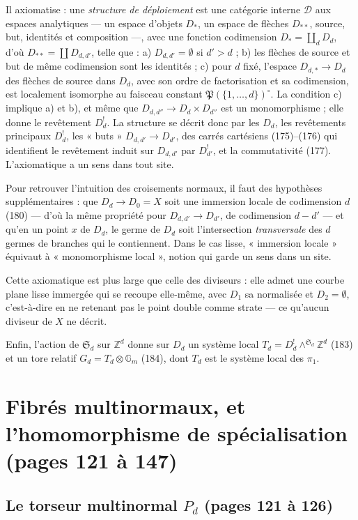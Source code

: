 \documentclass[11pt,a4paper]{article}
\begin{document}
Il axiomatise : une \emph{structure de déploiement} est une catégorie interne
$\mathcal{D}$ aux espaces analytiques — un espace d'objets $D_*$, un espace de
flèches $D_{**}$, source, but, identités et composition —, avec une fonction
codimension $D_* = \coprod_d D_d$, d'où $D_{**} = \coprod D_{d,d'}$, telle que : a)
$D_{d,d'} = \emptyset$ si $d' > d$ ; b) les flèches de source et but de même
codimension sont les identités ; c) pour $d$ fixé, l'espace $D_{d,*} \to D_d$ des
flèches de source dans $D_d$, avec son ordre de factorisation et sa codimension,
est localement isomorphe au faisceau constant $\mathfrak{P}(\{1, \dots,
d\})^{\circ}$. La condition c) implique a) et b), et même que $D_{d,d''} \to D_d
\times D_{d''}$ est un monomorphisme ; elle donne le revêtement $D^{!}_d$. La
structure se décrit donc par les $D_d$, les revêtements principaux $D^{!}_d$, les
« buts » $D_{d,d'} \to D_{d'}$, des carrés cartésiens (175)--(176) qui identifient
le revêtement induit sur $D_{d,d'}$ par $D^{!}_{d'}$, et la commutativité (177).
L'axiomatique a un sens dans tout site.

Pour retrouver l'intuition des croisements normaux, il faut des hypothèses
supplémentaires : que $D_d \to D_0 = X$ soit une immersion locale de codimension
$d$ (180) — d'où la même propriété pour $D_{d,d'} \to D_{d'}$, de codimension $d -
d'$ — et qu'en un point $x$ de $D_d$, le germe de $D_d$ soit l'intersection
\emph{transversale} des $d$ germes de branches qui le contiennent. Dans le cas
lisse, « immersion locale » équivaut à « monomorphisme local », notion qui garde
un sens dans un site.

Cette axiomatique est plus large que celle des diviseurs : elle admet une courbe
plane lisse immergée qui se recoupe elle-même, avec $D_1$ sa normalisée et $D_2 =
\emptyset$, c'est-à-dire en ne retenant pas le point double comme strate — ce
qu'aucun diviseur de $X$ ne décrit.

Enfin, l'action de $\mathfrak{S}_d$ sur $\mathbb{Z}^d$ donne sur $D_d$ un système
local $T_d = D^{!}_d \wedge^{\mathfrak{S}_d} \mathbb{Z}^d$ (183) et un tore relatif
$G_d = T_d \otimes \mathbb{G}_m$ (184), dont $T_d$ est le système local des
$\pi_1$.

\section*{Fibrés multinormaux, et l'homomorphisme de spécialisation (pages 121 à 147)}

\subsection*{Le torseur multinormal $P_d$ (pages 121 à 126)}
\end{document}

